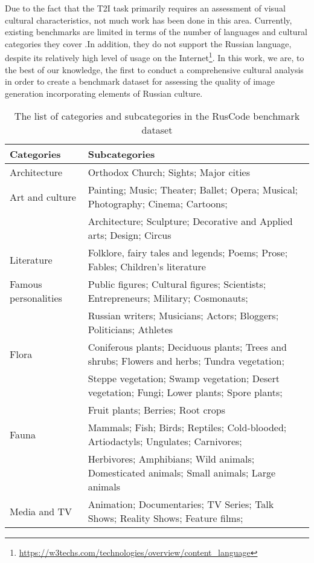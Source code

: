 Due to the fact that the T2I task primarily requires an assessment of visual cultural characteristics, not much work has been done in this area. Currently, existing benchmarks are limited in terms of the number of languages and cultural categories they cover \cite{kannen2024aestheticsculturalcompetencetexttoimage}.In addition, they do not support the Russian language, despite its relatively high level of usage on the Internet\footnote{\url{https://w3techs.com/technologies/overview/content_language}}. In this work, we are, to the best of our knowledge, the first to conduct a comprehensive cultural analysis in order to create a benchmark dataset for assessing the quality of image generation incorporating elements of Russian culture.

\begin{table*}[!t]
\caption{The list of categories and subcategories in the RusCode benchmark dataset}   
\centering
\small
\begin{tabular}{ll}
    \hline
    \textbf{Categories} & \textbf{Subcategories} \\
    \hline
    Architecture & Orthodox Church; Sights; Major cities\\
    \hline
    Art and culture & Painting; Music; Theater; Ballet; Opera; Musical; Photography; Cinema; Cartoons;\\
    & Architecture; Sculpture; Decorative and Applied arts; Design; Circus\\
    \hline
    Literature & Folklore, fairy tales and legends; Poems; Prose; Fables; Children's literature\\
    \hline
    Famous personalities & Public figures; Cultural figures; Scientists; Entrepreneurs; Military; Cosmonauts;\\
    & Russian writers; Musicians; Actors; Bloggers; Politicians; Athletes\\
    \hline
    Flora & Coniferous plants; Deciduous plants; Trees and shrubs; Flowers and herbs; Tundra vegetation;\\
    & Steppe vegetation; Swamp vegetation; Desert vegetation; Fungi; Lower plants; Spore plants;\\
    & Fruit plants; Berries; Root crops\\
    \hline
    Fauna & Mammals; Fish; Birds; Reptiles; Cold-blooded; Artiodactyls; Ungulates; Carnivores;\\
    & Herbivores; Amphibians; Wild animals; Domesticated animals; Small animals; Large animals\\
    \hline
    Media and TV & Animation; Documentaries; TV Series; Talk Shows; Reality Shows; Feature films;\\

\end{tabular}
\end{table*}
